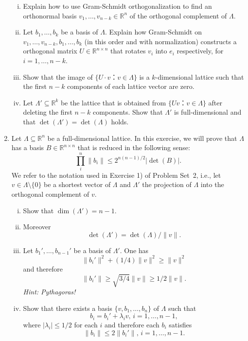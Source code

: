\documentclass[11pt,a4paper]{article}
\begin{document}
\begin{enumerate}[1)]
  \begin{enumerate}[i)] 
  \item Explain how to use Gram-Schmidt orthogonalization to find an
    orthonormal basis $v_1,\dots,v_{n-k}∈ ℝ^n$ of the orthogonal
    complement of $Λ$.
  \item Let $b_1,\dots,b_k$ be a basis of $Λ$. Explain how
    Gram-Schmidt on $v_1,\dots,v_{n-k},b_1,\dots,b_k$ (in this order
    and with normalization) constructs a orthogonal matrix
    $U ∈ ℝ^{ n ×n}$ that rotates $v_i$ into $e_i$ respectively, for
    $i=1,\dots,n-k$.
  \item Show that the image of $\{ U ⋅v ： v ∈ Λ\}$ is a $k$-dimensional lattice such that the first $n-k$ components of each lattice vector are zero.
  \item Let $Λ' ⊆ ℝ^k$ be the lattice that is obtained from $\{ U v ： v ∈ Λ\}$ after deleting the first $n-k$ components. Show that $Λ'$ is full-dimensional and that $\det(Λ') = \det(Λ)$ holds. 
  \end{enumerate}
\item Let $Λ⊆ℝ^n$ be a full-dimensional lattice. In this exercise, we will prove that $Λ$ has a basis $B ∈ℝ^{n ×n}$  that is reduced in the following sense:
  \begin{displaymath}
   ∏_i^n \|b_i\| ≤ 2^{n (n-1)/2}  |\det (B)|.
 \end{displaymath}
 We refer to the notation used in Exercise 1) of Problem Set~2, i.e., let $v ∈Λ \setminus \{0\}$ be a shortest vector of $Λ$ and $Λ'$ the projection of $Λ$ into the orthogonal complement of $v$.
 \begin{enumerate}[i)]
 \item Show that $\dim(Λ') = n-1$.
 \item Moreover 
   \begin{displaymath}
     \det(Λ') = \det(Λ) / \|v\|.  
   \end{displaymath}
 \item Let $b_1', \dots , b_{n-1}'$ be a basis of $Λ'$. One has
   \begin{displaymath}
     \| b_i'\| ^2 + (1/4) \|v\|^2 ≥ \|v\|^2
   \end{displaymath}
   and therefore
   \begin{displaymath}
     \| b_i'\|   ≥ \sqrt{3/4}\|v\| ≥ 1/2 \|v\|. 
   \end{displaymath}
   \hfill{\emph{Hint: Pythagoras!}}
    \item Show that there exists a basis $\{v,b_1,\dots,b_n\}$ of $Λ$ such that
   \begin{displaymath}
     b_i = b_i' + λ_i v ,  \,   i=1,\dots,n-1,
   \end{displaymath}
   where $|λ_i | ≤ 1/2$ for each $i$ and therefore each $b_i$ satisfies
   \begin{displaymath}
     \| b_i\|  ≤  2 \| b_i'\|, \, i=1,\dots,n-1.
   \end{displaymath}


\end{enumerate}
\end{enumerate}
\end{document}
